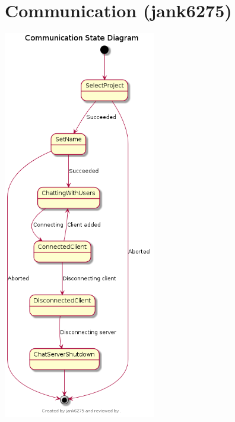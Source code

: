 \documentclass[11pt]{report}
\begin{document}
    \section{Communication (jank6275)}
        \begin{minipage}{1\textwidth}
            \begin{center}
                \includegraphics[width=0.5\textwidth]{diagrams/statechart-communication}
            \end{center}
        \end{minipage}
        
\end{document}
